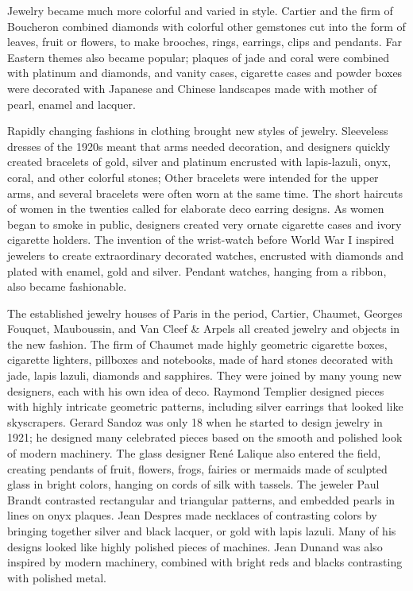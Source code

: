 Jewelry became much more colorful and varied in style. Cartier and the
firm of Boucheron combined diamonds with colorful other gemstones cut
into the form of leaves, fruit or flowers, to make brooches, rings,
earrings, clips and pendants. Far Eastern themes also became popular;
plaques of jade and coral were combined with platinum and diamonds, and
vanity cases, cigarette cases and powder boxes were decorated with
Japanese and Chinese landscapes made with mother of pearl, enamel and
lacquer.

Rapidly changing fashions in clothing brought new styles of jewelry.
Sleeveless dresses of the 1920s meant that arms needed decoration, and
designers quickly created bracelets of gold, silver and platinum
encrusted with lapis-lazuli, onyx, coral, and other colorful stones;
Other bracelets were intended for the upper arms, and several bracelets
were often worn at the same time. The short haircuts of women in the
twenties called for elaborate deco earring designs. As women began to
smoke in public, designers created very ornate cigarette cases and ivory
cigarette holders. The invention of the wrist-watch before World War I
inspired jewelers to create extraordinary decorated watches, encrusted
with diamonds and plated with enamel, gold and silver. Pendant watches,
hanging from a ribbon, also became fashionable.

The established jewelry houses of Paris in the period, Cartier, Chaumet,
Georges Fouquet, Mauboussin, and Van Cleef \& Arpels all created jewelry
and objects in the new fashion. The firm of Chaumet made highly
geometric cigarette boxes, cigarette lighters, pillboxes and notebooks,
made of hard stones decorated with jade, lapis lazuli, diamonds and
sapphires. They were joined by many young new designers, each with his
own idea of deco. Raymond Templier designed pieces with highly intricate
geometric patterns, including silver earrings that looked like
skyscrapers. Gerard Sandoz was only 18 when he started to design jewelry
in 1921; he designed many celebrated pieces based on the smooth and
polished look of modern machinery. The glass designer René Lalique also
entered the field, creating pendants of fruit, flowers, frogs, fairies
or mermaids made of sculpted glass in bright colors, hanging on cords of
silk with tassels. The jeweler Paul Brandt contrasted rectangular and
triangular patterns, and embedded pearls in lines on onyx plaques. Jean
Despres made necklaces of contrasting colors by bringing together silver
and black lacquer, or gold with lapis lazuli. Many of his designs looked
like highly polished pieces of machines. Jean Dunand was also inspired
by modern machinery, combined with bright reds and blacks contrasting
with polished metal.

